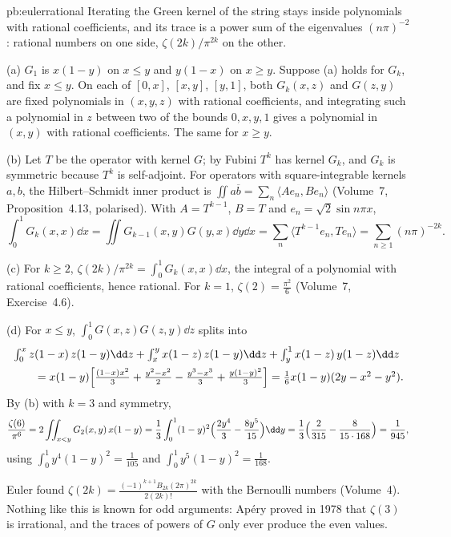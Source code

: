 \begin{solution}{pb:eulerrational}
\idea Iterating the Green kernel of the string stays inside polynomials with rational coefficients, and its trace is a power sum of the eigenvalues $(n\pi)^{-2}$: rational numbers on one side,
$\zeta(2k)/\pi^{2k}$ on the other.

\writeup (a) $G_1$ is $x(1-y)$ on $x\le y$ and $y(1-x)$ on $x\ge y$. Suppose (a) holds for $G_k$, and fix $x\le y$. On each of $[0,x]$, $[x,y]$, $[y,1]$, both $G_k(x,z)$ and $G(z,y)$ are fixed polynomials
in $(x,y,z)$ with rational coefficients, and integrating such a polynomial in $z$ between two of the bounds $0,x,y,1$ gives a polynomial in $(x,y)$ with rational coefficients. The same for $x\ge y$.

(b) Let $T$ be the operator with kernel $G$; by Fubini $T^k$ has kernel $G_k$, and $G_k$ is symmetric because $T^k$ is self-adjoint. For operators with square-integrable kernels $a,b$, the
Hilbert--Schmidt inner product is $\iint a\overline b=\sum_n\langle Ae_n,Be_n\rangle$ (Volume~7, Proposition~4.13, polarised). With $A=T^{k-1}$, $B=T$ and $e_n=\sqrt2\sin n\pi x$,
\[
\int_0^1G_k(x,x)\dd x=\iint G_{k-1}(x,y)G(y,x)\dd y\dd x=\sum_n\langle T^{k-1}e_n,Te_n\rangle=\sum_{n\ge1}(n\pi)^{-2k}.
\]

(c) For $k\ge2$, $\zeta(2k)/\pi^{2k}=\int_0^1G_k(x,x)\dd x$, the integral of a polynomial with rational coefficients, hence rational. For $k=1$, $\zeta(2)=\frac{\pi^2}6$ (Volume~7, Exercise~4.6).

(d) For $x\le y$, $\int_0^1G(x,z)G(z,y)\dd z$ splits into
\[
\begin{aligned}
&\textstyle\int_0^xz(1-x)\,z(1-y)\dd z+\int_x^yx(1-z)\,z(1-y)\dd z+\int_y^1x(1-z)\,y(1-z)\dd z\\
&\qquad\textstyle=x(1-y)\Bigl[\frac{(1-x)x^2}3+\frac{y^2-x^2}2-\frac{y^3-x^3}3+\frac{y(1-y)^2}3\Bigr]=\frac16x(1-y)(2y-x^2-y^2).
\end{aligned}
\]
By (b) with $k=3$ and symmetry,
\[
\frac{\zeta(6)}{\pi^6}=2\iint_{x<y}G_2(x,y)\,x(1-y)=\frac13\int_0^1(1-y)^2\Bigl(\frac{2y^4}3-\frac{8y^5}{15}\Bigr)\dd y=\frac13\Bigl(\frac2{315}-\frac8{15\cdot168}\Bigr)=\frac1{945},
\]
using $\int_0^1y^4(1-y)^2=\frac1{105}$ and $\int_0^1y^5(1-y)^2=\frac1{168}$.

\leads Euler found $\zeta(2k)=\frac{(-1)^{k+1}B_{2k}(2\pi)^{2k}}{2(2k)!}$ with the Bernoulli numbers (Volume~4). Nothing like this is known for odd arguments: Apéry proved in 1978 that $\zeta(3)$ is
irrational, and the traces of powers of $G$ only ever produce the even values.
\end{solution}

